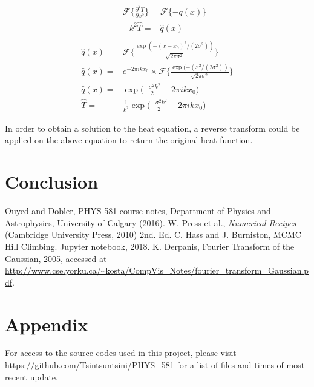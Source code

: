 \documentclass[twocolumn]{article}
\begin{document}
\begin{equation}
\begin{split}
&\mathcal{F}\{ \frac{\partial^2 T}{\partial x^2} \} = \mathcal{F} \{ -q(x) \} \\
&-k^2 \hat{T} = -\hat{q}(x) \\
&\\
\hat{q}(x) =& \mathcal{F} \{ \frac{\exp(-(x-x_0)^2/(2\sigma^2))}{\sqrt{2\pi\sigma^2}} \} \\
\hat{q}(x) =& e^{-2\pi ikx_0} \times \mathcal{F} \{ \frac{\exp(-(x^2/(2\sigma^2))}{\sqrt{2\pi\sigma^2}} \} \\
\hat{q}(x) =& \exp\bigg( \frac{-\sigma^2 k^2}{2} - 2\pi ikx_0 \bigg) \\
\hat{T} =& \frac{1}{k^2} \exp\bigg( \frac{-\sigma^2 k^2}{2} - 2\pi ikx_0 \bigg)
%
\end{split}
\label{eq:gauss_transform}
\end{equation}

In order to obtain a solution to the heat equation, a reverse transform could be applied on the above equation to return the original heat function.

\section{Conclusion}



\begin{thebibliography}{00}
	Ouyed and Dobler, PHYS 581 course notes, Department of Physics and Astrophysics, University of Calgary (2016).
	W. Press et al., \emph{Numerical Recipes} (Cambridge University Press, 2010) 2nd. Ed.
	C. Hass and J. Burniston, MCMC Hill Climbing. Jupyter notebook, 2018.
	K. Derpanis, Fourier Transform of the Gaussian, 2005, accessed at \url{http://www.cse.yorku.ca/~kosta/CompVis_Notes/fourier_transform_Gaussian.pdf}.
\end{thebibliography}

\section{Appendix}
For access to the source codes used in this project, please visit \url{https://github.com/Tsintsuntsini/PHYS_581} for a list of files and times of most recent update.
	
\end{document}
